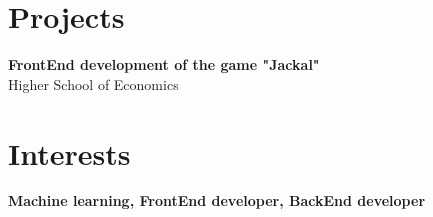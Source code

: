 \documentclass[a4paper,10pt]{article}
\newcommand{\MySkip}{
\vskip12pt
}
\begin{document}
\begin{adjustbox}{valign=t}
\begin{minipage}{0.6\textwidth}
\begin{description}
\end{description}

\section*{Projects}
\begin{description}
	\raggedright
	\item [\normalfont \textcolor{ColorOne}{2021}] \textbf{FrontEnd development of the game "Jackal"} \\
	Higher School of Economics
\end{description}

\MySkip
\section*{Interests}
\begin{description}
	\raggedright
	\item \textbf{Machine learning, FrontEnd developer, BackEnd developer}
\end{description}

\end{minipage}
\end{adjustbox}
\end{document}
